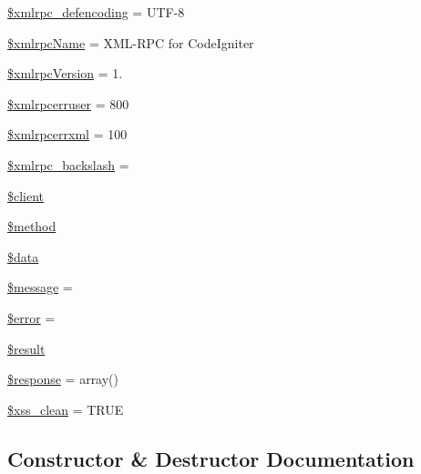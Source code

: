 \begin{DoxyCompactItemize}
\item 
\mbox{\hyperlink{class_c_i___xmlrpc_a7a31af447cebbb81b1f3c5581cd90d5a}{\$xmlrpc\+\_\+defencoding}} = \textquotesingle{}U\+TF-\/8\textquotesingle{}
\item 
\mbox{\hyperlink{class_c_i___xmlrpc_a1311a8891b845bf89b1bc459d54a6312}{\$xmlrpc\+Name}} = \textquotesingle{}X\+ML-\/R\+PC for Code\+Igniter\textquotesingle{}
\item 
\mbox{\hyperlink{class_c_i___xmlrpc_a4130f55bb1f23dcabf9cf3ae5f5a746d}{\$xmlrpc\+Version}} = \textquotesingle{}1.\textquotesingle{}
\item 
\mbox{\hyperlink{class_c_i___xmlrpc_a45bf41f1e861f94e04f463a638e5abf5}{\$xmlrpcerruser}} = 800
\item 
\mbox{\hyperlink{class_c_i___xmlrpc_af2500be600bfad88988409e6ff64c01c}{\$xmlrpcerrxml}} = 100
\item 
\mbox{\hyperlink{class_c_i___xmlrpc_a2bfcef776e3e3cd8f7700e375c6ccaec}{\$xmlrpc\+\_\+backslash}} = \textquotesingle{}\textquotesingle{}
\item 
\mbox{\hyperlink{class_c_i___xmlrpc_ad1405dc1ba2e288764378e79bff7a87d}{\$client}}
\item 
\mbox{\hyperlink{class_c_i___xmlrpc_a12661b2fc0f57f97e30a1620889ce9c6}{\$method}}
\item 
\mbox{\hyperlink{class_c_i___xmlrpc_a6efc15b5a2314dd4b5aaa556a375c6d6}{\$data}}
\item 
\mbox{\hyperlink{class_c_i___xmlrpc_abf17cb2dba2ed17cb28aa5f37deb5293}{\$message}} = \textquotesingle{}\textquotesingle{}
\item 
\mbox{\hyperlink{class_c_i___xmlrpc_aeba2ab722cedda53dbb7ec1a59f45550}{\$error}} = \textquotesingle{}\textquotesingle{}
\item 
\mbox{\hyperlink{class_c_i___xmlrpc_a112ef069ddc0454086e3d1e6d8d55d07}{\$result}}
\item 
\mbox{\hyperlink{class_c_i___xmlrpc_af4b6fb1bbc77ccc05f10da3b16935b99}{\$response}} = array()
\item 
\mbox{\hyperlink{class_c_i___xmlrpc_a0f2ee8861c0b3164a5c6e126dd98c0cc}{\$xss\+\_\+clean}} = T\+R\+UE
\end{DoxyCompactItemize}


\subsection{Constructor \& Destructor Documentation}
\mbox{\label{class_c_i___xmlrpc_af7f9493844d2d66e924e3c1df51ce616}} 
